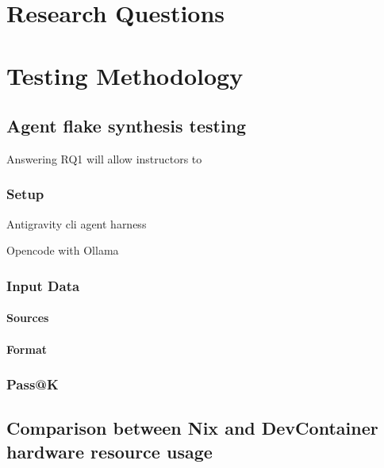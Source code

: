 \chapter{Research Questions}\label{RQ}

\chapter{Testing Methodology}\label{chap:testing}

\section{Agent flake synthesis testing}

Answering RQ1 will allow instructors to

\subsection{Setup}

Antigravity cli agent harness

Opencode with Ollama

\subsection{Input Data}



\subsubsection{Sources}
\subsubsection{Format}

\subsection{Pass@K}

\section{Comparison between Nix and DevContainer hardware resource usage}





